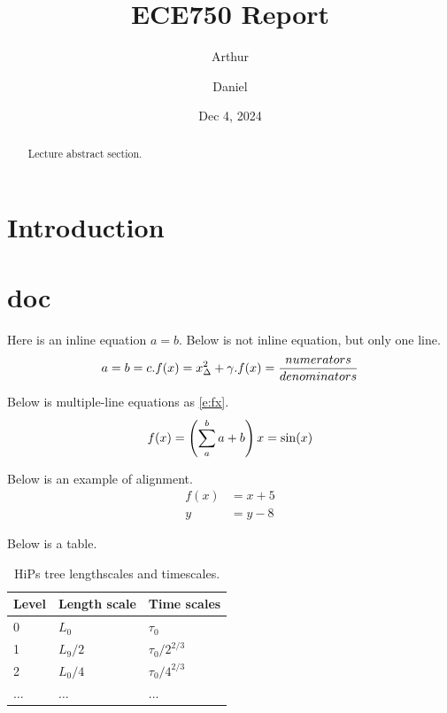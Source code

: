 \documentclass[letterpaper, 11pt]{article}
\begin{document}
\title{ECE750 Report}
\author{Arthur}
\author{Daniel}
\date{Dec 4, 2024}
\maketitle

\begin{abstract}
    
    Lecture abstract section.
\end{abstract}
\section{Introduction}\label{s:intro}
\section{doc}
Here is an inline equation $a=b$. Below is not inline equation, but only one line.
\[
a = b = c.\\
f(x) = x_{\Delta}^2  + \gamma.
f(x) = \frac{numerators}{denominators}
\]

Below is multiple-line equations as \ref{e:fx}.
\begin{equation}\label{e:fx}
    f(x) = \left(\sum_a^ba+b\right)   \\ 
    x = \sin(x)
\end{equation}

Below is an example of alignment.
\begin{align}
    f(x) &= x + 5 \\
    y &= y - 8
\end{align}

Below is a table.
\begin{table}[h]
    \caption{HiPs tree lengthscales and timescales.}
    \label{t:hips_scales}
    \centering
    \begin{tabular}{l l l}
        \hline
        Level & Length scale  &Time scales \\
        \hline
        0  & $L_0$      & $\tau _0$     \\
        1 & $L_9/{2}$    & $\tau_0/2^{2/3}$    \\
        2   & $L_0/4$    & $\tau_0/4^{2/3}$ \\
        $\ldots$  & $\ldots$ & $\ldots$  \\ 
        \hline 
        
    \end{tabular}
\end{table}
\end{document}
